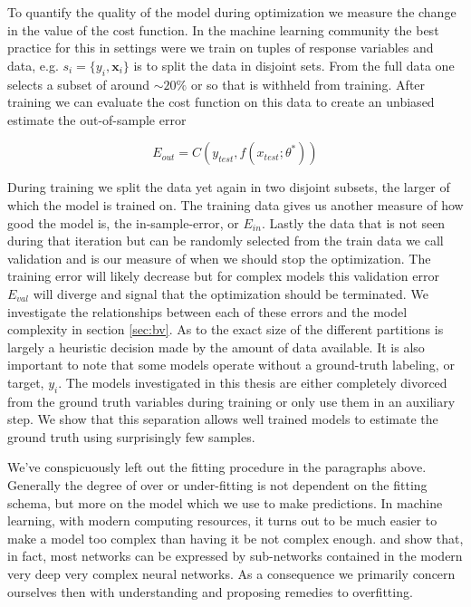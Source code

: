 \noindent To quantify the quality of the model during optimization we measure the change in the value of the cost function. In the machine learning community the best practice for this in settings were we train on tuples of response variables and data, e.g. $s_i = \{y_i, \mathbf{x}_i\}$ is to split the data in disjoint sets. From the full data one selects a subset of around $\sim 20\%$ or so that is withheld from training. After training we can evaluate the cost function on this data to create an unbiased estimate the out-of-sample error

\begin{equation}
E_{out} = C(y_{test}, f(x_{test}; \theta^*))
\end{equation}

\noindent During training we split the data yet again in two disjoint subsets, the larger of which the model is trained on. The training data gives us another measure of how good the model is, the in-sample-error, or $E_{in}$. Lastly the data that is not seen during that iteration but can be randomly selected from the train data we call validation and is our measure of when we should stop the optimization. The training error will likely decrease but for complex models this validation error $E_{val}$ will diverge and signal that the optimization should be terminated. We investigate the relationships between each of these errors and the model complexity in section \ref{sec:bv}. As to the exact size of the different partitions is largely a heuristic decision made by the amount of data available. It is also important to note that some models operate without a ground-truth labeling, or target, $y_i$. The models investigated in this thesis are either completely divorced from the ground truth variables during training or only use them in an auxiliary step. We show that this separation allows well trained models to estimate the ground truth using surprisingly few samples. 

We've conspicuously left out the fitting procedure in the paragraphs above. Generally the degree of over or under-fitting is not dependent on the fitting schema, but more on the model which we use to make predictions. In machine learning, with modern computing resources, it turns out to be much easier to make a model too complex than having it be not complex enough. \citet{Frankle2019} and \citet{Frankle2018} show that, in fact, most networks can be expressed by sub-networks contained in the modern very deep very complex neural networks. As a consequence we primarily concern ourselves then with understanding and proposing remedies to overfitting. 

